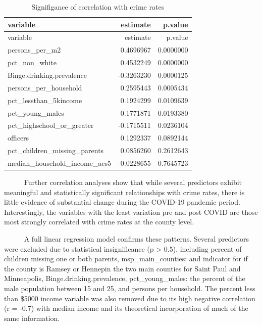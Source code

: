 \documentclass[
  11pt,
  letterpaper,
  DIV=11,
  numbers=noendperiod]{scrartcl}
\begin{document}
\begin{longtable}[]{@{}lrr@{}}
\caption{Signifigance of correlation with crime rates}\tabularnewline
\toprule\noalign{}
variable & estimate & p.value \\
\midrule\noalign{}
\endfirsthead
\toprule\noalign{}
variable & estimate & p.value \\
\midrule\noalign{}
\endhead
\bottomrule\noalign{}
\endlastfoot
persons\_per\_m2 & 0.4696967 & 0.0000000 \\
pct\_non\_white & 0.4532249 & 0.0000000 \\
Binge.drinking.prevalence & -0.3263230 & 0.0000125 \\
persons\_per\_household & 0.2595443 & 0.0005434 \\
pct\_lessthan\_5kincome & 0.1924299 & 0.0109639 \\
pct\_young\_males & 0.1771871 & 0.0193380 \\
pct\_highschool\_or\_greater & -0.1715511 & 0.0236104 \\
officers & 0.1292337 & 0.0892144 \\
pct\_children\_missing\_parents & 0.0856260 & 0.2612643 \\
median\_household\_income\_acs5 & -0.0228655 & 0.7645723 \\
\end{longtable}

~~~~~ Further correlation analyses show that while several predictors
exhibit meaningful and statistically significant relationships with
crime rates, there is little evidence of substantial change during the
COVID-19 pandemic period. Interestingly, the variables with the least
variation pre and post COVID are those most strongly correlated with
crime rates at the county level.\\
\strut ~~~~~ A full linear regression model confirms these patterns.
Several predictors were excluded due to statistical insignificance (p
\textgreater{} 0.5), including percent of children missing one or both
parents, msp\_main\_counties: and indicator for if the county is Ramsey
or Hennepin the two main counties for Saint Paul and Minneapolis,
Binge.drinking.prevalence, pct\_young\_males: the percent of the male
population between 15 and 25, and persons per household. The percent
less than \$5000 income variable was also removed due to its high
negative correlation (r = -0.7) with median income and its theoretical
incorporation of much of the same information.
\end{document}
